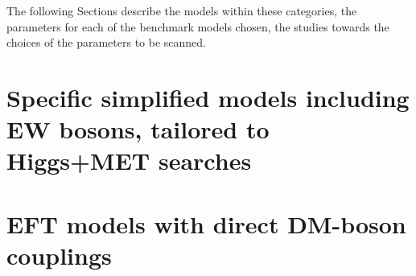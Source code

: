 The following Sections describe the models within these categories,
the parameters for each of the benchmark models chosen,
the studies towards the choices of the parameters to be scanned.

\section{Specific simplified models including EW bosons, tailored to Higgs+MET searches}
\label{sec:monoHiggs}


\section{EFT models with direct DM-boson couplings}
\label{sec:EFT_models_with_direct_DM_boson_couplings}

